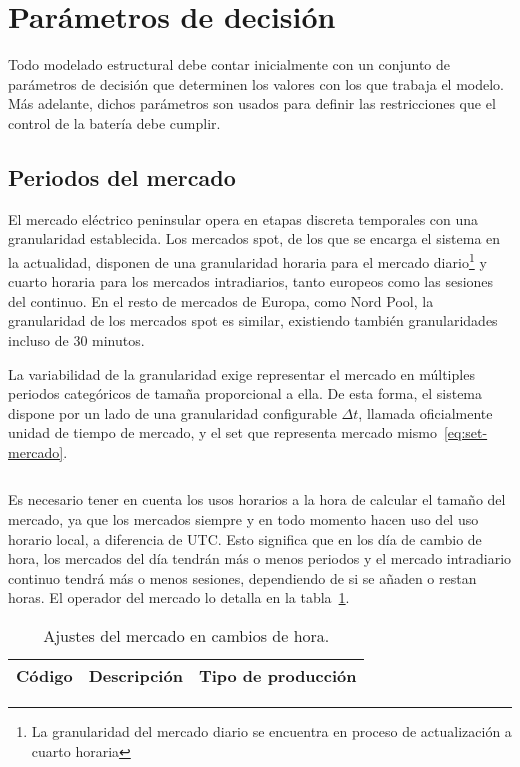 \section{Parámetros de decisión}
\label{makereference5.1}

Todo modelado estructural debe contar inicialmente con un conjunto de parámetros de decisión que determinen los valores con los que trabaja el modelo. Más adelante, dichos parámetros son usados para definir las restricciones que el control de la batería debe cumplir.

\subsection{Periodos del mercado}
\label{makereference5.1.1}

El mercado eléctrico peninsular opera en etapas discreta temporales con una granularidad establecida. Los mercados spot, de los que se encarga el sistema en la actualidad, disponen de una granularidad horaria para el mercado diario\footnote{La granularidad del mercado diario se encuentra en proceso de actualización a cuarto horaria} y cuarto horaria para los mercados intradiarios, tanto europeos como las sesiones del continuo. En el resto de mercados de Europa, como Nord Pool, la granularidad de los mercados spot es similar, existiendo también granularidades incluso de 30 minutos.

La variabilidad de la granularidad exige representar el mercado en múltiples periodos categóricos de tamaña proporcional a ella. De esta forma, el sistema dispone por un lado de una granularidad configurable \( \Delta t \), llamada oficialmente unidad de tiempo de mercado, y el set que representa mercado mismo~\ref{eq:set-mercado}.

\begin{equation}
  \label{eq:set-mercado}
\end{equation}

Es necesario tener en cuenta los usos horarios a la hora de calcular el tamaño del mercado, ya que los mercados siempre y en todo momento hacen uso del uso horario local, a diferencia de UTC. Esto significa que en los día de cambio de hora, los mercados del día tendrán más o menos periodos y el mercado intradiario continuo tendrá más o menos sesiones, dependiendo de si se añaden o restan horas. El operador del mercado lo detalla en la tabla~\ref{tab:cambio-hora}.

\begin{table}[ht]
  \centering
  \begin{tabular}[c]{|l|l|l|}
    \hline
    Código & Descripción & Tipo de producción\\
    \hline
    \hline
  \end{tabular}
  \caption{Ajustes del mercado en cambios de hora.}
  \label{tab:cambio-hora}
\end{table}

